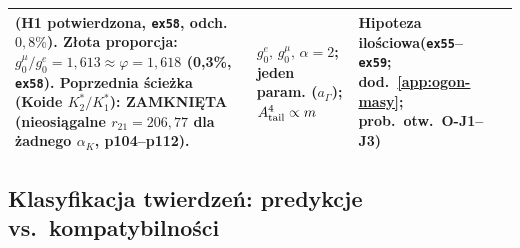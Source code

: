 \begin{center}
\begin{tabular}{@{}>{\raggedright}p{2.5cm}p{5.5cm}p{2.2cm}p{2.5cm}@{}}
    (H1 potwierdzona, \texttt{ex58}, odch.\ $0{,}8\%$).
    Z\l{}ota proporcja: $g_0^\mu/g_0^e = 1{,}613 \approx \varphi = 1{,}618$
    (0{,}3\%, \texttt{ex58}).
    Poprzednia \'scie\.zka (Koide $K^*_2/K^*_1$):
    ZAMKNI\k{E}TA (nieosi\k{a}galne $r_{21}=206{,}77$ dla \.zadnego $\alpha_K$,
    p104--p112).
  & $g_0^e,\, g_0^\mu,\, \alpha = 2$;\newline
    jeden param. ($a_\Gamma$);\newline
    $A_{\rm tail}^4 \propto m$
  & Hipoteza ilo\'sciowa\newline (\texttt{ex55}--\texttt{ex59};\newline
    dod.~\ref{app:ogon-masy};\newline
    prob.\ otw.\ O-J1--J3) \\
\bottomrule
\end{tabular}
\end{center}

\subsection{Klasyfikacja twierdze\'n: predykcje vs.\ kompatybilno\'sci}%
\label{ssec:klasyfikacja}

